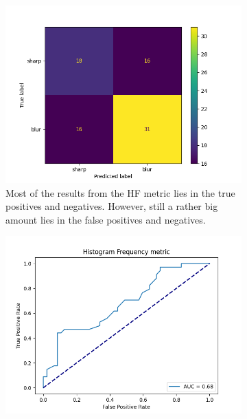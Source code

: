 \begin{figure}[H]
\begin{subfigure}[t]{0.49\textwidth}
        \label{fig:hf_roc}
    \end{subfigure}
    \begin{subfigure}[t]{0.49\textwidth}
        \centering
        \includegraphics[width=\textwidth]{Figures/BlurredImages/output_HF_conf_mat.png}
        \caption{Most of the results from the HF metric lies in the true positives and negatives. However, still a rather big amount lies in the false positives and negatives.}
        \label{fig:hf_conf_mat}
    \end{subfigure}
    \hfill
    \begin{subfigure}[t]{0.49\textwidth}
        \centering
        \includegraphics[width=\textwidth]{Figures/BlurredImages/output_HF_roc.png}

\end{subfigure}
\end{figure}
